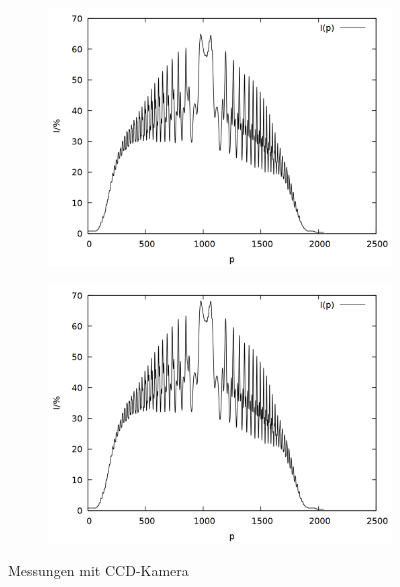 \begin{figure}[!h]
\begin{subfigure}{0.45\textwidth}
\includegraphics[width=\textwidth]{data/zeeman/out_7_2_raw.png}
\end{subfigure}
\begin{subfigure}{0.45\textwidth}
\includegraphics[width=\textwidth]{data/zeeman/out_7_5_raw.png}
\end{subfigure}
\caption{Messungen mit CCD-Kamera}
\label{fig:raw_1}
\end{figure}

\newpage

